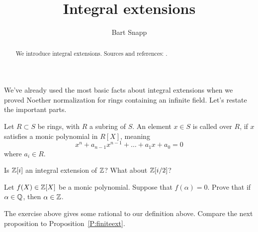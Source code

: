 \documentclass{ximera}
\author{Bart Snapp}
\title{Integral extensions}
\begin{document}
\begin{abstract}
  We introduce integral extensions. Sources and references:
  \cite{AM1969,iK1974}.
\end{abstract}
\maketitle


We've already used the most basic facts about integral extensions when
we proved Noether normalization for rings containing an infinite
field. Let's restate the important parts.
\begin{definition}
  Let $R\subset S$ be rings, with $R$ a subring of $S$. An element
  $x\in S$ is called  over $R$, if $x$ satisfies a monic
  polynomial in $R[X]$, meaning
  \[
  x^n + a_{n-1} x^{n-1} + \dots + a_1 x + a_0  = 0
  \]
  where $a_i\in R$.
\end{definition}


\begin{exercise}
  Is $\mathbb Z[i]$ an integral extension of $\mathbb Z$? What about $\mathbb Z[i/2]$?
\end{exercise}


\begin{exercise}
  Let $f(X)\in\mathbb Z[X]$ be a monic polynomial. Suppose that $f(\alpha) =
  0$. Prove that if $\alpha\in\mathbb Q$, then $\alpha\in\mathbb Z$.
\end{exercise}




The exercise above gives some rational to our definition
above. Compare the next proposition to Proposition~\ref{P:finiteext}.
\end{document}
